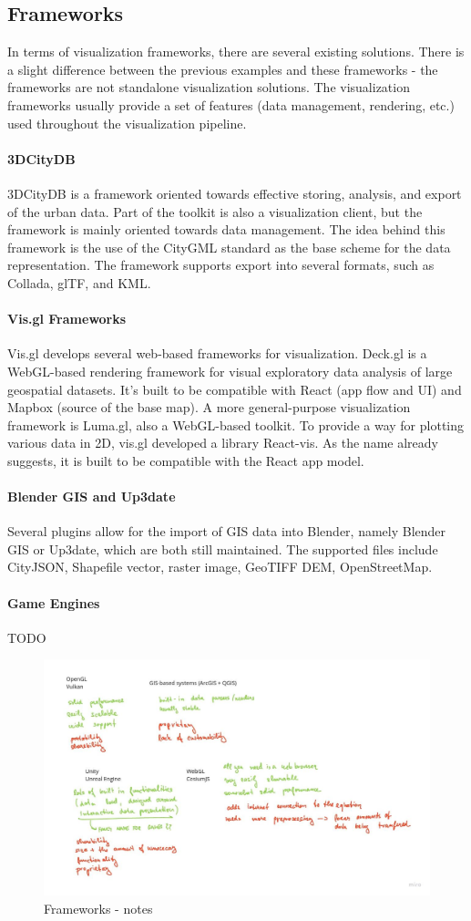 \subsection{Frameworks}
In terms of visualization frameworks, there are several existing solutions. There is a slight difference between the previous examples and these frameworks - the frameworks are not standalone visualization solutions. The visualization frameworks usually provide a set of features (data management, rendering, etc.) used throughout the visualization pipeline. 

\paragraph{3DCityDB}
3DCityDB is a framework oriented towards effective storing, analysis, and export of the urban data. Part of the toolkit is also a visualization client, but the framework is mainly oriented towards data management. The idea behind this framework is the use of the CityGML standard as the base scheme for the data representation. The framework supports export into several formats, such as Collada, glTF, and KML.

\paragraph{Vis.gl Frameworks}
Vis.gl develops several web-based frameworks for visualization. Deck.gl is a WebGL-based rendering framework for visual exploratory data analysis of large geospatial datasets. It's built to be compatible with React (app flow and UI) and Mapbox (source of the base map). A more general-purpose visualization framework is Luma.gl, also a WebGL-based toolkit. To provide a way for plotting various data in 2D, vis.gl developed a library React-vis. As the name already suggests, it is built to be compatible with the React app model.

\paragraph{Blender GIS and Up3date}
Several plugins allow for the import of GIS data into Blender, namely Blender GIS or Up3date, which are both still maintained. The supported files include CityJSON, Shapefile vector, raster image, GeoTIFF DEM, OpenStreetMap. 

\paragraph{Game Engines}
TODO

\begin{figure}[h]
    \centering
    \includegraphics[width=\linewidth]{img/frameworknotes.jpg}
    \caption{Frameworks - notes}
\end{figure}